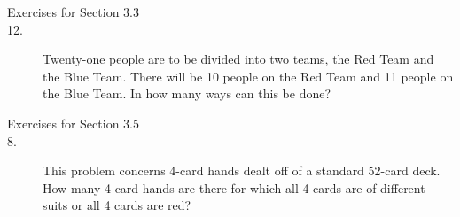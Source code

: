 \documentclass{article}
\begin{document}
\begin{description}
\item[Exercises for Section 3.3]

\item[12.] Twenty-one people are to be divided into two teams, the Red
  Team and the Blue Team.  There will be 10 people on the Red Team and
  11 people on the Blue Team.  In how many ways can this be done?

\item[Exercises for Section 3.5]


\item[8.] This problem concerns 4-card hands dealt off of a standard
  52-card deck.  How many 4-card hands are there for which all 4 cards
  are of different suits or all 4 cards are red?




\end{description}
\end{document}
